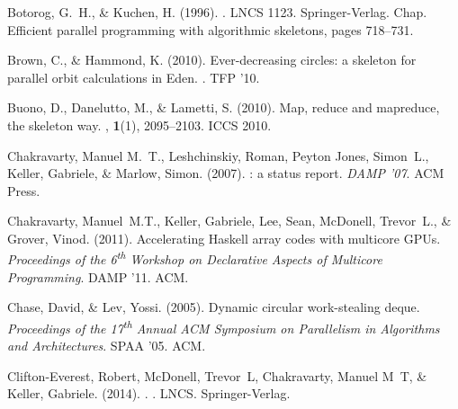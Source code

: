 \documentclass{jfp1}
\DeclareRobustCommand{\xth}{\textsuperscript{th}\xspace}
\DeclareRobustCommand{\xth}{\textsuperscript{th}\xspace}
\begin{document}
\begin{thebibliography}{}
Botorog, G.~H., \& Kuchen, H. (1996).
.
\newblock LNCS 1123.
\newblock Springer-Verlag.
\newblock Chap. Efficient parallel programming with algorithmic skeletons,
  pages  718--731.

Brown, C., \& Hammond, K. (2010).
\newblock Ever-decreasing circles: a skeleton for parallel orbit calculations
  in {Eden}.
.
\newblock TFP '10.

Buono, D., Danelutto, M., \& Lametti, S. (2010).
\newblock Map, reduce and mapreduce, the skeleton way.
, {\bf 1}(1), 2095--2103.
\newblock ICCS 2010.

{C}hakravarty, Manuel M.~T., {L}eshchinskiy, Roman, {P}eyton {J}ones, Simon~L.,
  {K}eller, Gabriele, \& {M}arlow, Simon. (2007).
: a status report.
 {\em DAMP '07}.
\newblock ACM Press.

Chakravarty, Manuel~M.T., Keller, Gabriele, Lee, Sean, McDonell, Trevor~L., \&
  Grover, Vinod. (2011).
\newblock Accelerating {Haskell} array codes with multicore {GPUs}.
 {\em Proceedings of the 6\xth Workshop on
  Declarative Aspects of Multicore Programming}.
\newblock DAMP '11.
\newblock ACM.

Chase, David, \& Lev, Yossi. (2005).
\newblock Dynamic circular work-stealing deque.
 {\em Proceedings of the 17\xth Annual ACM
  Symposium on Parallelism in Algorithms and Architectures}.
\newblock SPAA '05.
\newblock ACM.

Clifton-Everest, Robert, McDonell, Trevor~L, Chakravarty, Manuel M~T, \&
  Keller, Gabriele. (2014).
.
.
\newblock LNCS.
\newblock Springer-Verlag.


\end{thebibliography}
\end{document}
